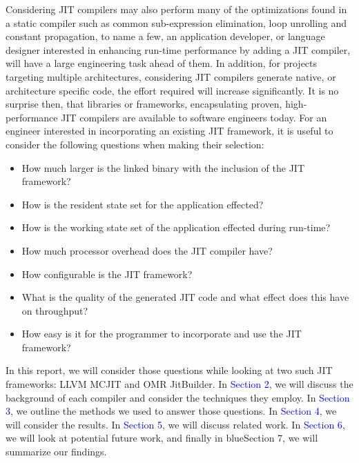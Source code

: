Considering JIT compilers may also perform many of the optimizations found in a static compiler such as common sub-expression elimination, loop unrolling and constant propagation, to name a few, an application developer, or language designer interested in enhancing run-time performance by adding a JIT compiler, will have a large engineering task ahead of them.
In addition, for projects targeting multiple architectures, considering JIT compilers generate native, or architecture specific code, the effort required will increase significantly.
It is no surprise then, that libraries or frameworks, encapsulating proven, high-performance JIT compilers are available to software engineers today.
For an engineer interested in incorporating an existing JIT framework, it is useful to consider the following questions when making their selection: 
\begin{itemize}
    \item How much larger is the linked binary with the inclusion of the JIT framework?
    \item How is the resident state set for the application effected?
    \item How is the working state set of the application effected during run-time?
    \item How much processor overhead does the JIT compiler have?
    \item How configurable is the JIT framework?
    \item What is the quality of the generated JIT code and what effect does this have on throughput?
    \item How easy is it for the programmer to incorporate and use the JIT framework?
\end{itemize} 

In this report, we will consider those questions while looking at two such JIT frameworks: LLVM MCJIT and OMR JitBuilder.
In \textcolor{blue}{Section 2}, we will discuss the background of each compiler and consider the techniques they employ.
In \textcolor{blue}{Section 3}, we outline the methods we used to answer those questions.
In \textcolor{blue}{Section 4}, we will consider the results.
In \textcolor{blue}{Section 5}, we will discuss related work.
In \textcolor{blue}{Section 6}, we will look at potential future work, and finally in {blue}{Section 7}, we will summarize our findings.





